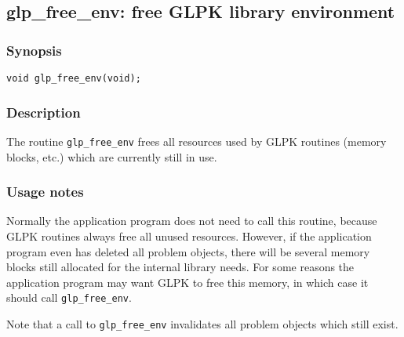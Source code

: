 \subsection{glp\_free\_env: free GLPK library environment}

\subsubsection*{Synopsis}

\begin{verbatim}
void glp_free_env(void);
\end{verbatim}

\subsubsection*{Description}

The routine \verb|glp_free_env| frees all resources used by GLPK
routines (memory blocks, etc.) which are currently still in use.

\subsubsection*{Usage notes}

Normally the application program does not need to call this routine,
because GLPK routines always free all unused resources. However, if
the application program even has deleted all problem objects, there
will be several memory blocks still allocated for the internal library
needs. For some reasons the application program may want GLPK to free
this memory, in which case it should call \verb|glp_free_env|.

Note that a call to \verb|glp_free_env| invalidates all problem objects
which still exist.

